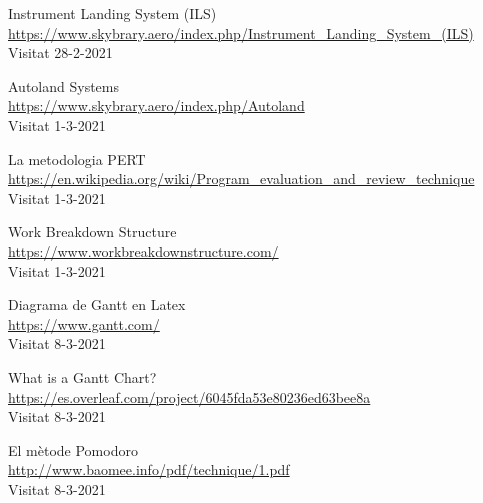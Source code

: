 \documentclass[10pt,a4paper,twocolumn,twoside]{article}
\begin{document}
\begin{thebibliography}{9}
Instrument Landing System (ILS)
\\\url{https://www.skybrary.aero/index.php/Instrument_Landing_System_(ILS)}
\\Visitat 28-2-2021

Autoland Systems
\\\url{https://www.skybrary.aero/index.php/Autoland}
\\Visitat 1-3-2021

La metodologia PERT
\\\url{https://en.wikipedia.org/wiki/Program_evaluation_and_review_technique}
\\Visitat 1-3-2021

Work Breakdown Structure
\\\url{https://www.workbreakdownstructure.com/}
\\Visitat 1-3-2021

Diagrama de Gantt en Latex
\\\url{https://www.gantt.com/}
\\Visitat 8-3-2021

What is a Gantt Chart?
\\\url{https://es.overleaf.com/project/6045fda53e80236ed63bee8a}
\\Visitat 8-3-2021

El mètode Pomodoro
\\\url{http://www.baomee.info/pdf/technique/1.pdf}
\\Visitat 8-3-2021

\end{thebibliography}
\end{document}
